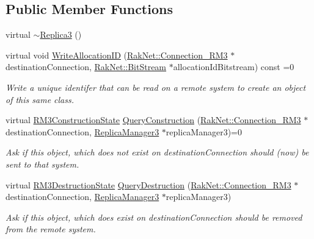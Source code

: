 \subsection*{Public Member Functions}
\begin{DoxyCompactItemize}
\item 
virtual \hyperlink{class_rak_net_1_1_replica3_a1fbe0ed0e0c540bbad1da2549b1a4074}{$\sim$\-Replica3} ()
\item 
virtual void \hyperlink{class_rak_net_1_1_replica3_ada0458bb521a455f23e08742c9e1b0b9}{Write\-Allocation\-I\-D} (\hyperlink{class_rak_net_1_1_connection___r_m3}{Rak\-Net\-::\-Connection\-\_\-\-R\-M3} $\ast$destination\-Connection, \hyperlink{class_rak_net_1_1_bit_stream}{Rak\-Net\-::\-Bit\-Stream} $\ast$allocation\-Id\-Bitstream) const =0
\begin{DoxyCompactList}\small\item\em Write a unique identifer that can be read on a remote system to create an object of this same class. \end{DoxyCompactList}\item 
virtual \hyperlink{group___r_e_p_l_i_c_a___m_a_n_a_g_e_r___g_r_o_u_p3_ga16aaecf3c23582f0de6652b348ccfa38}{R\-M3\-Construction\-State} \hyperlink{class_rak_net_1_1_replica3_ad826e04ce6a0db4e32c3d990fd27e943}{Query\-Construction} (\hyperlink{class_rak_net_1_1_connection___r_m3}{Rak\-Net\-::\-Connection\-\_\-\-R\-M3} $\ast$destination\-Connection, \hyperlink{class_rak_net_1_1_replica_manager3}{Replica\-Manager3} $\ast$replica\-Manager3)=0
\begin{DoxyCompactList}\small\item\em Ask if this object, which does not exist on {\itshape destination\-Connection} should (now) be sent to that system. \end{DoxyCompactList}\item 
virtual \hyperlink{group___r_e_p_l_i_c_a___m_a_n_a_g_e_r___g_r_o_u_p3_ga400c157a937f062bd8a3c19a49d33541}{R\-M3\-Destruction\-State} \hyperlink{class_rak_net_1_1_replica3_ab476629672d62c7c33c8b1d8aa606918}{Query\-Destruction} (\hyperlink{class_rak_net_1_1_connection___r_m3}{Rak\-Net\-::\-Connection\-\_\-\-R\-M3} $\ast$destination\-Connection, \hyperlink{class_rak_net_1_1_replica_manager3}{Replica\-Manager3} $\ast$replica\-Manager3)
\begin{DoxyCompactList}\small\item\em Ask if this object, which does exist on {\itshape destination\-Connection} should be removed from the remote system. \end{DoxyCompactList}\item 

\end{DoxyCompactItemize}
